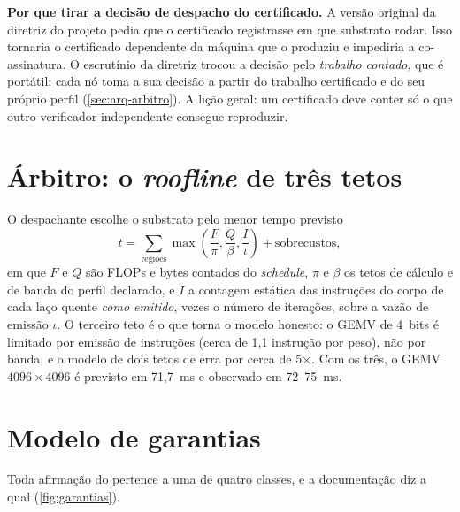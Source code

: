 \begin{mestrado}
\textbf{Por que tirar a decisão de despacho do certificado.} A versão original da diretriz do projeto pedia que o certificado registrasse em que substrato rodar. Isso tornaria o certificado dependente da máquina que o produziu e impediria a co-assinatura. O escrutínio da diretriz trocou a decisão pelo \emph{trabalho contado}, que é portátil: cada nó toma a sua decisão a partir do trabalho certificado e do seu próprio perfil (\autoref{sec:arq-arbitro}). A lição geral: um certificado deve conter só o que outro verificador independente consegue reproduzir.
\end{mestrado}

\section{Árbitro: o \textit{roofline} de três tetos}\label{sec:arq-arbitro}

O despachante escolhe o substrato pelo menor tempo previsto
\begin{equation}
  t = \sum_{\text{regiões}} \max\!\left(\frac{F}{\pi}, \frac{Q}{\beta}, \frac{I}{\iota}\right) + \text{sobrecustos},
  \label{eq:roofline}
\end{equation}
em que $F$ e $Q$ são FLOPs e bytes contados do \textit{schedule}, $\pi$ e $\beta$ os tetos de cálculo e de banda do perfil declarado, e $I$ a contagem estática das instruções do corpo de cada laço quente \emph{como emitido}, vezes o número de iterações, sobre a vazão de emissão $\iota$. O terceiro teto é o que torna o modelo honesto: o GEMV de 4~bits é limitado por emissão de instruções (cerca de 1,1 instrução por peso), não por banda, e o modelo de dois tetos de  erra por cerca de 5$\times$. Com os três, o GEMV $4096 \times 4096$ é previsto em 71,7~ms e observado em 72--75~ms.

\section{Modelo de garantias}\label{sec:arq-garantias}

Toda afirmação do \vapor{} pertence a uma de quatro classes, e a documentação diz a qual (\autoref{fig:garantias}).

